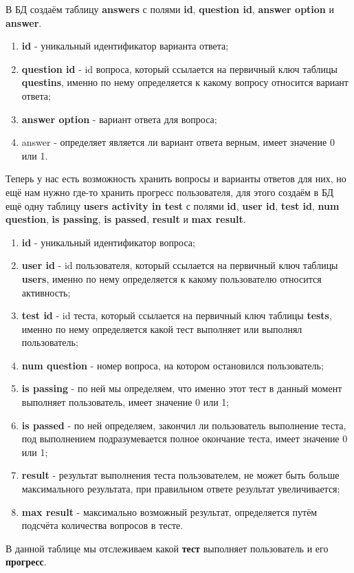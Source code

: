 \documentclass[12pt, oldlfont, amsfonts]{report}
\begin{document}
В БД создаём таблицу {\bf answers} с полями {\bf id}, {\bf question id}, {\bf answer option} и {\bf answer}.
\begin{enumerate}
\item {\bf id} - уникальный идентификатор варианта ответа;
\item {\bf question id} - id вопроса, который ссылается на первичный ключ таблицы {\bf questins}, именно по нему определяется к какому вопросу относится вариант ответа;
\item {\bf answer option} - вариант ответа для вопроса;
\item {answer} - определяет является ли вариант ответа верным, имеет значение 0 или 1.
\end{enumerate}	
Теперь у нас есть возможность хранить вопросы и варианты ответов для них, но ещё нам нужно где-то хранить прогресс пользователя, для этого создаём в БД ещё одну таблицу {\bf users activity in test} с полями {\bf id}, {\bf user id}, {\bf test id}, {\bf num question}, {\bf is passing}, {\bf is passed}, {\bf result} и {\bf max result}.
\begin{enumerate}
\item {\bf id} - уникальный идентификатор вопроса;
\item {\bf user id} - id пользователя, который ссылается на первичный ключ таблицы {\bf users}, именно по нему определяется к какому пользователю относится активность;
\item {\bf test id} - id теста, который ссылается на первичный ключ таблицы {\bf tests}, именно по нему определяется какой тест выполняет или выполнял пользователь;
\item {\bf num question} - номер вопроса, на котором остановился пользователь;
\item {\bf is passing} - по ней мы определяем, что именно этот тест в данный момент выполняет пользователь, имеет значение 0 или 1;
\item {\bf is passed} - по ней определяем, закончил ли пользователь выполнение теста, под выполнением подразумевается полное окончание теста, имеет значение 0 или 1;
\item {\bf result} - результат выполнения теста пользователем, не может быть больше максимального результата, при правильном ответе результат увеличивается;
\item {\bf max result} - максимально возможный результат, определяется путём подсчёта количества вопросов в тесте. 
\end{enumerate}	
В данной таблице мы отслеживаем какой {\bf тест} выполняет пользователь и его {\bf прогресс}. 
\end{document}
